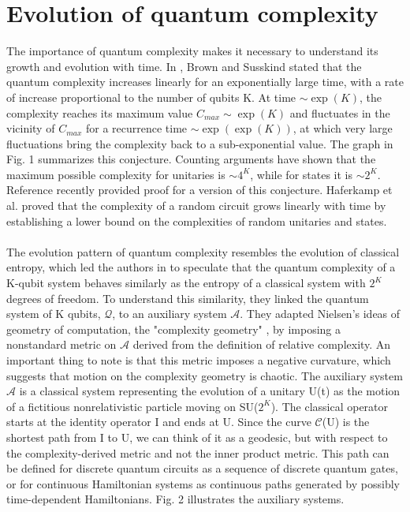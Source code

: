 \section{Evolution of quantum complexity}
The importance of quantum complexity makes it necessary to understand its growth and evolution with time. In \cite{brown2018second}, Brown and Susskind stated that the quantum complexity increases linearly for an exponentially large time, with a rate of increase proportional to the number of qubits K. At time $\sim \exp{(K)}$, the complexity reaches its maximum value $C_{max} \sim \exp{(K)}$ and fluctuates in the vicinity of $C_{max}$ for a recurrence time $\sim \exp{(\exp{(K)})}$, at which very large fluctuations bring the complexity back to a sub-exponential value. The graph in Fig. 1 summarizes this conjecture. Counting arguments have shown that the maximum possible complexity for unitaries is $\sim 4^K$, while for states it is $\sim 2^K$.
\\
Reference \cite{haferkamp2022linear} recently provided proof for a version of this conjecture. Haferkamp et al. proved that the complexity of a random circuit grows linearly with time by establishing a lower bound on the complexities of random unitaries and states.\\
\\
The evolution pattern of quantum complexity resembles the evolution of classical entropy, which led the authors in \cite{brown2018second} to speculate that the quantum complexity of a K-qubit system behaves similarly as the entropy of a classical system with $2^K$ degrees of freedom. To understand this similarity, they linked the quantum system of K qubits, $\mathcal{Q}$, to an auxiliary system $\mathcal{A}$. They adapted Nielsen's ideas of geometry of computation, the "complexity geometry" \cite{brown2017quantum}, by imposing a nonstandard metric on $\mathcal{A}$ derived from the definition of relative complexity. An important thing to note is that this metric imposes a negative curvature, which suggests that motion on the complexity geometry is chaotic. The auxiliary system $\mathcal{A}$ is a classical system representing the evolution of a unitary U(t) as the motion of a fictitious nonrelativistic particle moving on SU($2^K$). The classical operator starts at the identity operator I and ends at U. Since the curve $\mathcal{C}$(U) is the shortest path from I to U, we can think of it as a geodesic, but with respect to the complexity-derived metric and not the inner product metric. This path can be defined for discrete quantum circuits as a sequence of discrete quantum gates, or for continuous Hamiltonian systems as continuous paths generated by possibly time-dependent Hamiltonians. Fig. 2 illustrates the auxiliary systems. 

